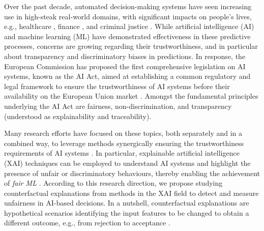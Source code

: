 \documentclass[letterpaper]{article} %
\begin{document}
Over the past decade, automated decision-making systems have seen increasing use in high-steak real-world domains, with significant impacts on people's lives, e.g., healthcare \cite{Morik10}, finance \cite{cao2020ai}, and criminal justice \cite{angwin2016machine,DBLP:journals/corr/abs-1905-12728}. While artificial intelligence (AI) and machine learning (ML) have demonstrated effectiveness in these predictive processes, concerns are growing regarding their trustworthiness, and in particular about transparency and discriminatory biases in predictions.
%
In response, the European Commission has proposed the first comprehensive legislation on AI systems, known as the AI Act, aimed at establishing a common regulatory and legal framework to ensure the trustworthiness of AI systems before their availability on the European Union market \cite{europeancommission2021}. Amongst the fundamental principles underlying the AI Act are fairness, non-discrimination, and transparency (understood as explainability and traceability).

Many research efforts have focused on these topics, both separately and in a combined way, to leverage methods synergically ensuring the trustworthiness requirements of AI systems \cite{mucsanyi2023trustworthy}.
%
In particular, explainable artificial intelligence (XAI) techniques \cite{8466590} can be employed to understand AI systems and highlight the presence of unfair or discriminatory behaviours, thereby enabling the achievement of \textit{fair ML} \cite{10.1145/3616865}.
%
According to this research direction, we propose studying counterfactual explanations from methods in the XAI field to detect and measure unfairness in AI-based decisions. In a nutshell, counterfactual explanations are hypothetical scenarios identifying the input features to be changed to obtain a different outcome, e.g., from rejection to acceptance \cite{guidotti2022counterfactual,10.1145/3527848}. 
\end{document}

